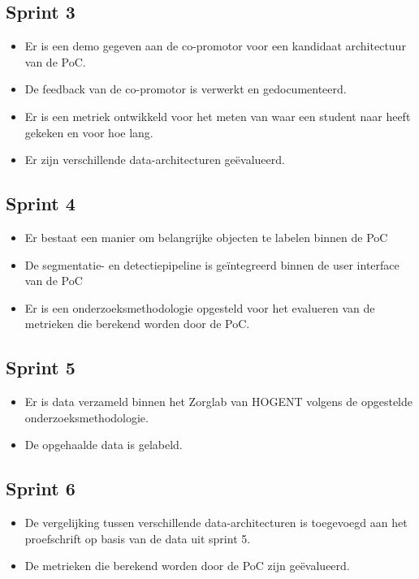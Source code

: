 \subsection{Sprint 3}
\begin{itemize}
    \item Er is een demo gegeven aan de co-promotor voor een kandidaat architectuur van de PoC.
    \item De feedback van de co-promotor is verwerkt en gedocumenteerd.
    \item Er is een metriek ontwikkeld voor het meten van waar een student naar heeft gekeken en voor hoe lang.
    \item Er zijn verschillende data-architecturen geëvalueerd.
\end{itemize}
\subsection{Sprint 4}
\begin{itemize}
    \item Er bestaat een manier om belangrijke objecten te labelen binnen de PoC
    \item De segmentatie- en detectiepipeline is geïntegreerd binnen de user interface van de PoC
    \item Er is een onderzoeksmethodologie opgesteld voor het evalueren van de metrieken die berekend worden door de PoC.
\end{itemize}
\subsection{Sprint 5}
\begin{itemize}
    \item Er is data verzameld binnen het Zorglab van HOGENT volgens de opgestelde onderzoeksmethodologie.
    \item De opgehaalde data is gelabeld.
\end{itemize}
\subsection{Sprint 6}
\begin{itemize}
    \item De vergelijking tussen verschillende data-architecturen is toegevoegd aan het proefschrift op basis van de data uit sprint 5.
    \item De metrieken die berekend worden door de PoC zijn geëvalueerd.
\end{itemize}
